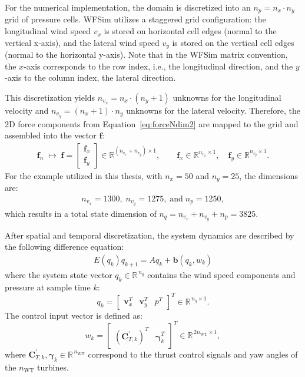 For the numerical implementation, the domain is discretized into an $n_p = n_x \cdot n_y$ grid of pressure cells. WFSim utilizes a staggered grid configuration: the longitudinal wind speed $v_x$ is stored on horizontal cell edges (normal to the vertical x-axis), and the lateral wind speed $v_y$ is stored on the vertical cell edges (normal to the horizontal y-axis). Note that in the WFSim matrix convention, the $x$-axis corresponds to the row index, i.e., the longitudinal direction, and the $y$-axis to the column index, the lateral direction.

This discretization yields $n_{v_x} = n_x \cdot (n_y+1)$ unknowns for the longitudinal velocity and $n_{v_y} = (n_x+1) \cdot n_y$ unknowns for the lateral velocity. Therefore, the 2D force components from Equation~\eqref{eq:forceNdim2} are mapped to the grid and assembled into the vector $\bm{f}$:
\begin{align}\label{eq:forceWFSim}
    \bm{f}_n \;\mapsto\; \bm{f} =
    \begin{bmatrix}
        \bm{f}_{x} \\[1mm]
        \bm{f}_{y}
    \end{bmatrix} \in \mathbb{R}^{(n_{v_x}+n_{v_y}) \times 1}, 
    \qquad 
    \bm{f}_{x} \in \mathbb{R}^{n_{v_x} \times 1}, \quad
    \bm{f}_{y} \in \mathbb{R}^{n_{v_y} \times 1}.
\end{align}
For the example utilized in this thesis, with $n_x = 50$ and $n_y = 25$, the dimensions are:
\begin{align*}
    n_{v_x} = 1300,\;  n_{v_y} = 1275, \;\text{and}\; n_{p} = 1250,
\end{align*}
which results in a total state dimension of $n_q = n_{v_x} + n_{v_y} + n_p = 3825$.

After spatial and temporal discretization, the system dynamics are described by the following difference equation:
\begin{align} \label{eq:WfsinGrid}
    E(q_k)q_{k+1} = Aq_k + \bm{b}(q_k, w_k)
\end{align}
where the system state vector $q_k \in \mathbb{R}^{\,n_q}$ contains the wind speed components and pressure at sample time $k$:
\[
q_k = 
\begin{bmatrix} 
    \bm{v}_x^T   & \bm{v}_y^T   & p^T   
\end{bmatrix}^T \in \mathbb{R}^{\,n_{q} \times 1}.
\]
The control input vector is defined as:
\[
w_k = 
\begin{bmatrix} 
    (\bm{C}_{T,k}^{\prime})^T   & \bm{\gamma}_k^T   
\end{bmatrix}^T   
\in \mathbb{R}^{\,2n_{\mathrm{WT}}\times 1},
\]
where $\bm{C}_{T,k}^{\prime}, \bm{\gamma}_k \in \mathbb{R}^{\,n_{\mathrm{WT}}}$ correspond to the thrust control signals and yaw angles of the $n_{\mathrm{WT}}$ turbines.

